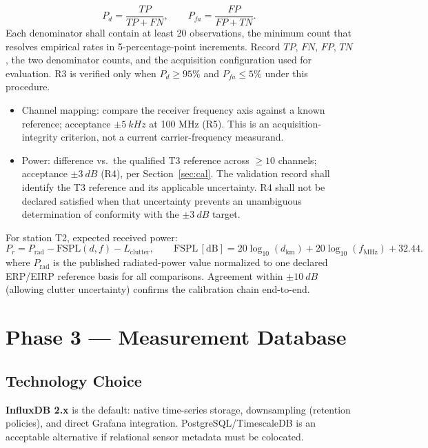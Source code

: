 \documentclass[12pt,a4paper]{report}
\newcommand{\dB}{\ensuremath{\mathrm{dB}}}
\newcommand{\MHz}{\ensuremath{\mathrm{MHz}}}
\begin{document}
\begin{description}
\begin{equation}
 		P_d = \frac{TP}{TP+FN}, \qquad P_{fa} = \frac{FP}{FP+TN}.
 	\end{equation}
 	Each denominator shall contain at least 20 observations, the minimum count that resolves empirical rates in 5-percentage-point increments. Record $TP$, $FN$, $FP$, $TN$, the two denominator counts, and the acquisition configuration used for evaluation. R3 is verified only when $P_d \ge 95\%$ and $P_{fa} \le 5\%$ under this procedure.
 	\item[Power accuracy and channel-mapping integrity] \begin{itemize}
 		\item Channel mapping: compare the receiver frequency axis against a known reference; acceptance $\pm \SI{5}{kHz}$ at 100 MHz (R5). This is an acquisition-integrity criterion, not a current carrier-frequency measurand.
 		\item Power: difference vs.\ the qualified T3 reference across $\ge 10$
 		channels; acceptance $\pm \SI{3}{dB}$ (R4), per Section~\ref{sec:cal}.
 		The validation record shall identify the T3 reference and its applicable
 		uncertainty. R4 shall not be declared satisfied when that uncertainty prevents
 		an unambiguous determination of conformity with the $\pm\SI{3}{dB}$ target.
 	\end{itemize}
 	\item[Plausibility check via link budget.] 	For station T2, expected received power:
 	\begin{equation}
 		P_r = P_{\text{rad}} - \text{FSPL}(d,f) - L_{\text{clutter}},
 		\qquad
 		\text{FSPL}\,[\dB] = 20\log_{10}(d_{\text{km}}) + 20\log_{10}(f_{\MHz}) + 32.44.
 	\end{equation}
 	where $P_{\text{rad}}$ is the published radiated-power value normalized to one declared ERP/EIRP reference basis for all comparisons. Agreement within $\pm \SI{10}{dB}$ (allowing clutter uncertainty) confirms
 	the calibration chain end-to-end.
 \end{description}
 \section{Phase 3 --- Measurement Database}
 \subsection*{Technology Choice}
 \textbf{InfluxDB 2.x} is the default: native time-series storage, downsampling
 (retention policies), and direct Grafana integration. PostgreSQL/TimescaleDB
 is an acceptable alternative if relational sensor metadata must be colocated.
\end{document}
